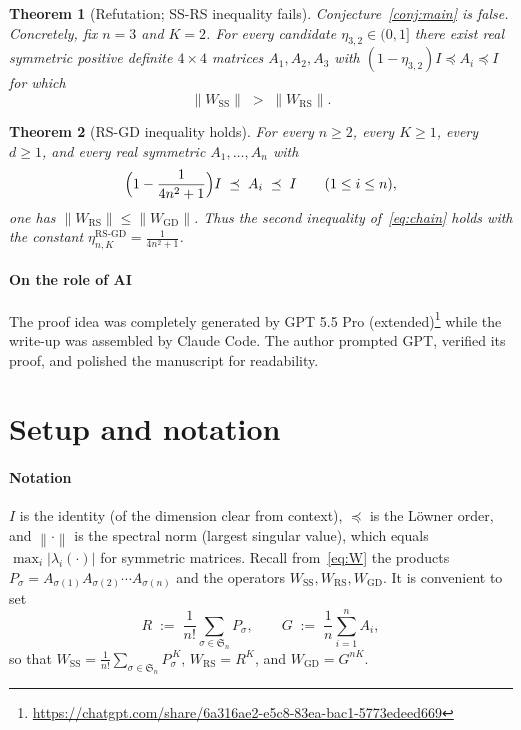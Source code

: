 \documentclass[11pt]{article}
\newtheorem{theorem}{Theorem}
\theoremstyle{definition}
\theoremstyle{remark}
\newcommand{\Sn}{\mathfrak{S}_n}
\newcommand{\norm}[1]{\left\lVert #1 \right\rVert}
\newcommand{\Wss}{W_{\mathrm{SS}}}
\newcommand{\Wrs}{W_{\mathrm{RS}}}
\newcommand{\Wgd}{W_{\mathrm{GD}}}
\newcommand{\psdle}{\preceq}
\begin{document}
\begin{theorem}[Refutation; SS-RS inequality fails]\label{thm:refute}
Conjecture~\ref{conj:main} is false. Concretely, fix $n=3$ and $K=2$. For every candidate
$\eta_{3,2}\in(0,1]$ there exist real symmetric positive definite $4\times4$ matrices
$A_1,A_2,A_3$ with $(1-\eta_{3,2})I\psdle A_i\psdle I$ for which
\[
\norm{\Wss}\;>\;\norm{\Wrs}.
\]
\end{theorem}

\begin{theorem}[RS-GD inequality holds]\label{thm:rsgd}
For every $n\ge2$, every $K\ge1$, every $d\ge1$, and every real symmetric $A_1,\dots,A_n$ with
\[
\Bigl(1-\frac1{4n^2+1}\Bigr)I\;\psdle\;A_i\;\psdle\;I\qquad(1\le i\le n),
\]
one has $\norm{\Wrs}\le\norm{\Wgd}$. Thus the second inequality of~\eqref{eq:chain} holds with the constant $\eta_{n,K}^{\mathrm{RS\text{-}GD}}=\tfrac1{4n^2+1}$.
\end{theorem}

\paragraph{On the role of AI} The proof idea was completely generated by GPT 5.5 Pro (extended)\footnote{\url{https://chatgpt.com/share/6a316ae2-e5c8-83ea-bac1-5773edeed669}} while the write-up was assembled by Claude Code. The author prompted GPT, verified its proof, and polished the manuscript for readability.


\section{Setup and notation}\label{sec:setup}

\paragraph{Notation} $I$ is the identity (of the
dimension clear from context), $\psdle$ is the L\"owner order, and $\norm{\cdot}$ is the spectral
norm (largest singular value), which equals $\max_i|\lambda_i(\cdot)|$ for symmetric matrices.
Recall from~\eqref{eq:W} the products $P_\sigma=A_{\sigma(1)}A_{\sigma(2)}\cdots A_{\sigma(n)}$ and the
operators $\Wss,\Wrs,\Wgd$. It is convenient to set
\[
R \;:=\; \frac1{n!}\sum_{\sigma\in\Sn} P_\sigma, \qquad
G \;:=\; \frac1n\sum_{i=1}^n A_i,
\]
so that $\Wss=\frac1{n!}\sum_{\sigma\in\Sn}P_\sigma^{\,K}$, $\Wrs=R^K$, and $\Wgd=G^{nK}$.
\end{document}
